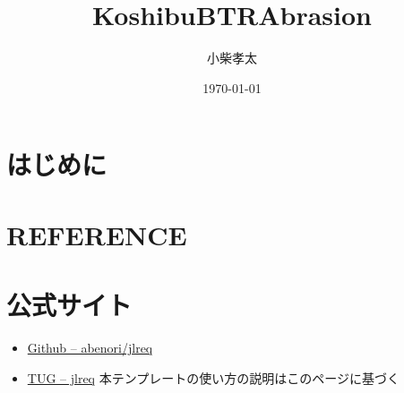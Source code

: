 \documentclass{jlreq}
\title{KoshibuBTRAbrasion}
\author{小柴孝太}
\date{\today}
\begin{document}
\section{はじめに}\label{sec:intro}










\section{REFERENCE}


\section{公式サイト}
\begin{itemize}
    \item \href{https://github.com/abenori/jlreq}{Github -- abenori/jlreq}
    \item \href{https://www.tug.org/texlive//Contents/live/texmf-dist/doc/latex/jlreq/jlreq-ja.html}{TUG -- jlreq} 本テンプレートの使い方の説明はこのページに基づく
\end{itemize}
\end{document}
